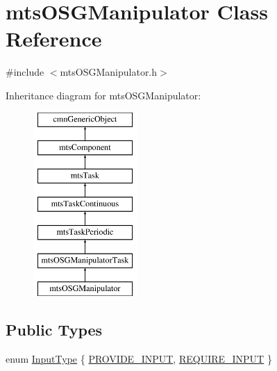 \hypertarget{classmts_o_s_g_manipulator}{\section{mts\-O\-S\-G\-Manipulator Class Reference}
\label{classmts_o_s_g_manipulator}
}


{\ttfamily \#include $<$mts\-O\-S\-G\-Manipulator.\-h$>$}

Inheritance diagram for mts\-O\-S\-G\-Manipulator\-:\begin{figure}[H]
\begin{center}
\leavevmode
\includegraphics[height=7.000000cm]{db/d74/classmts_o_s_g_manipulator}
\end{center}
\end{figure}
\subsection*{Public Types}
\begin{DoxyCompactItemize}
\item 
enum \hyperlink{classmts_o_s_g_manipulator_ac2491ea5f0c735f009c5f8ff91a931b4}{Input\-Type} \{ \hyperlink{classmts_o_s_g_manipulator_ac2491ea5f0c735f009c5f8ff91a931b4a3a5dee79e64f14d03c1ca221e70c40f1}{P\-R\-O\-V\-I\-D\-E\-\_\-\-I\-N\-P\-U\-T}, 
\hyperlink{classmts_o_s_g_manipulator_ac2491ea5f0c735f009c5f8ff91a931b4afc23931d1d2d8d3422b75cecac33291d}{R\-E\-Q\-U\-I\-R\-E\-\_\-\-I\-N\-P\-U\-T}
 \}
\end{DoxyCompactItemize}
